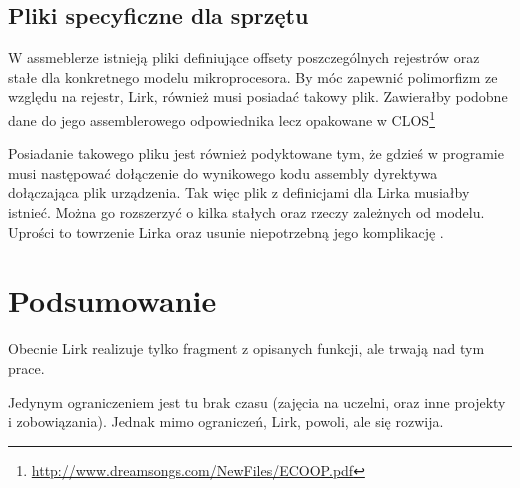 \documentclass[11pt]{article}
\begin{document}
\subsection{Pliki specyficzne dla sprzętu}
W assmeblerze istnieją pliki definiujące offsety poszczególnych rejestrów oraz stałe dla konkretnego modelu mikroprocesora.
By móc zapewnić polimorfizm ze względu na rejestr, Lirk, również musi posiadać takowy plik.
Zawierałby podobne dane do jego assemblerowego odpowiednika lecz opakowane w CLOS\footnote{\url{http://www.dreamsongs.com/NewFiles/ECOOP.pdf}}
 
Posiadanie takowego pliku jest również podyktowane tym, że gdzieś w programie musi następować
dołączenie do wynikowego kodu assembly dyrektywa dołączająca plik urządzenia.
Tak więc plik z definicjami dla Lirka musiałby istnieć. Można go rozszerzyć o kilka stałych oraz rzeczy zależnych od modelu.
Uprości to towrzenie Lirka oraz usunie niepotrzebną jego komplikację .

\section{Podsumowanie}
Obecnie Lirk realizuje tylko fragment z opisanych funkcji, ale trwają nad tym prace. 

Jedynym ograniczeniem jest tu brak czasu (zajęcia na uczelni, oraz inne projekty i zobowiązania). Jednak mimo ograniczeń, Lirk, powoli, ale się rozwija.
\end{document}
